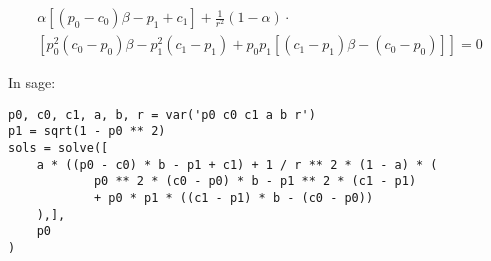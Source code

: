 \documentclass{article}
\begin{document}
\begin{align*}
\alpha\left[\left(p_0 - c_0\right) \beta -p_1 + c_1\right] + \frac 1 {r^2}(1 - \alpha) \cdot\\
\left[
	 p_0^2 \left(c_0 - p_0\right) \beta -  p_1^2\left(c_1 -  p_1\right)
	+ p_0p_1\left[
		\left( c_1 - p_1\right)\beta - \left(c_0 - p_0\right)
	\right]
\right] = 0
\end{align*}


In sage:
\begin{verbatim}
p0, c0, c1, a, b, r = var('p0 c0 c1 a b r')
p1 = sqrt(1 - p0 ** 2)
sols = solve([
    a * ((p0 - c0) * b - p1 + c1) + 1 / r ** 2 * (1 - a) * (
            p0 ** 2 * (c0 - p0) * b - p1 ** 2 * (c1 - p1) 
            + p0 * p1 * ((c1 - p1) * b - (c0 - p0))
    ),],
    p0
)
\end{verbatim}

\end{document}
